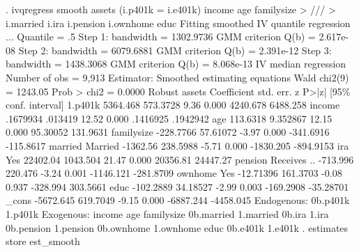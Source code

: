 . ivqregress smooth assets (i.p401k = i.e401k) income age familysize           
>    ///
>         i.married i.ira i.pension i.ownhome educ
{\smallskip}
Fitting smoothed IV quantile regression ...
{\smallskip}
Quantile = .5
Step 1:   bandwidth =  1302.9736    GMM criterion Q(b) =  2.617e-08
Step 2:   bandwidth =  6079.6881    GMM criterion Q(b) =  2.391e-12
Step 3:   bandwidth =  1438.3068    GMM criterion Q(b) =  8.068e-13
{\smallskip}
IV median regression                                   Number of obs =   9,913
Estimator: Smoothed estimating equations               Wald chi2(9)  = 1243.05
                                                       Prob > chi2   =  0.0000
{\smallskip}
             {\VBAR}               Robust
      assets {\VBAR} Coefficient  std. err.      z    P>|z|     [95\% conf. interval]
     1.p401k {\VBAR}   5364.468   573.3728     9.36   0.000     4240.678    6488.258
      income {\VBAR}   .1679934    .013419    12.52   0.000     .1416925    .1942942
         age {\VBAR}   113.6318   9.352867    12.15   0.000     95.30052    131.9631
  familysize {\VBAR}  -228.7766   57.61072    -3.97   0.000    -341.6916   -115.8617
             {\VBAR}
     married {\VBAR}
    Married  {\VBAR}   -1362.56   238.5988    -5.71   0.000    -1830.205   -894.9153
             {\VBAR}
         ira {\VBAR}
        Yes  {\VBAR}   22402.04   1043.504    21.47   0.000     20356.81    24447.27
             {\VBAR}
     pension {\VBAR}
Receives ..  {\VBAR}   -713.996    220.476    -3.24   0.001    -1146.121   -281.8709
             {\VBAR}
     ownhome {\VBAR}
        Yes  {\VBAR}  -12.71396   161.3703    -0.08   0.937     -328.994    303.5661
        educ {\VBAR}  -102.2889   34.18527    -2.99   0.003    -169.2908   -35.28701
       _cons {\VBAR}  -5672.645   619.7049    -9.15   0.000    -6887.244   -4458.045
Endogenous: 0b.p401k 1.p401k
 Exogenous: income age familysize 0b.married 1.married 0b.ira 1.ira
            0b.pension 1.pension 0b.ownhome 1.ownhome educ 0b.e401k 1.e401k
{\smallskip}
. estimates store est_smooth
